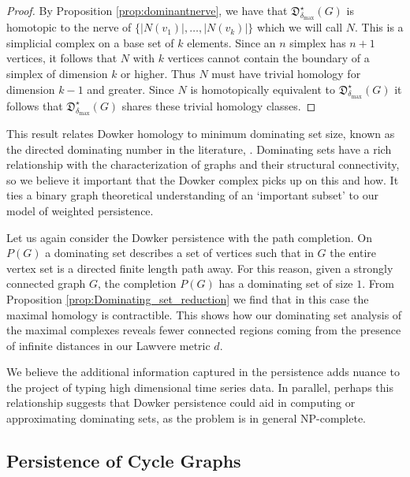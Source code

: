 \documentclass[pdflatex,bst/sn-mathphys-num]{sn-jnl}%
\theoremstyle{thmstyleone}%
\theoremstyle{definition}
\theoremstyle{thmstyletwo}%
\newcommand{\FD}{\mathfrak{D}}
\theoremstyle{thmstylethree}%
\begin{document}
\begin{proof}
    By Proposition \ref{prop:dominantnerve}, we have that $\FD^\star_{\delta_\text{max}}(G)$ is homotopic to the nerve of $\{|N(v_1)|, \dotsc , |N(v_k)|\}$ which we will call $N$. This is a simplicial complex on a base set of $k$ elements. Since an $n$ simplex has $n+1$ vertices, it follows that $N$ with $k$ vertices cannot contain the boundary of a simplex of dimension $k$ or higher. Thus $N$ must have trivial homology for dimension $k-1$ and greater. Since $N$ is homotopically equivalent to $\FD^\star_{\delta_\text{max}}(G)$ it follows that $\FD^\star_{\delta_\text{max}}(G)$ shares these trivial homology classes.
\end{proof}

This result relates Dowker homology to minimum dominating set size, known as the directed dominating number in the literature, \cite{CARO_Dominating_Number}. Dominating sets have a rich relationship with the characterization of graphs and their structural connectivity, so we believe it important that the Dowker complex picks up on this and how. It ties a binary graph theoretical understanding of an `important subset' to our model of weighted persistence. 

Let us again consider the Dowker persistence with the path completion. On $P(G)$ a dominating set describes a set of vertices such that in $G$ the entire vertex set is a directed finite length path away. For this reason, given a strongly connected graph $G$, the completion $P(G)$ has a dominating set of size $1$. From Proposition \ref{prop:Dominating_set_reduction} we find that in this case the maximal homology is contractible. This shows how our dominating set analysis of the maximal complexes reveals fewer connected regions coming from the presence of infinite distances in our Lawvere metric $d$.

We believe the additional information captured in the persistence adds nuance to the project of typing high dimensional time series data. In parallel, perhaps this relationship suggests that Dowker persistence could aid in computing or approximating dominating sets, as the problem is in general NP-complete.



% 
% 



\subsection{Persistence of Cycle Graphs}\label{sec:cycle_persistence}
\end{document}
